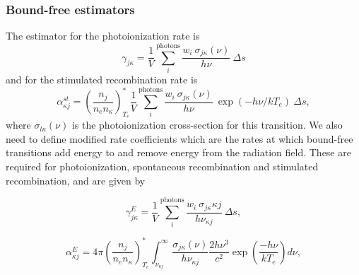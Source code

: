 \subsubsection{Bound-free estimators}
The estimator for the photoionization rate is 
\begin{equation}
\gamma_{j\kappa} = \frac{1}{V} \sum_i^{\mathrm{photons}} 
\frac{w_i~\sigma_{j\kappa}({\nu})}{h \nu}~\Delta s
\end{equation}
and for the stimulated recombination rate is
\begin{equation}
\alpha_{\kappa j}^{st} =\left( \frac{n_j}{n_e n_\kappa} \right)^*_{T_e}
\frac{1}{V} \sum_i^{\mathrm{photons}} 
\frac{w_i~\sigma_{j\kappa}({\nu})}{h \nu}
~\exp(-h\nu/kT_e)~\Delta s,
\end{equation}
where $\sigma_{l\kappa} (\nu)$ is the photoionization cross-section for this transition.
We also need to define modified rate coefficients which 
are the rates at which bound-free transitions add energy to and remove energy from 
the radiation field. These are required for photoionization, 
spontaneous recombination and stimulated recombination, and are given by

\begin{equation}
\gamma^E_{j\kappa} = \frac{1}{V} \sum_i^{\mathrm{photons}} 
\frac{w_i~\sigma_{j\kappa}{\kappa j}}{h \nu_{\kappa j}}~\Delta s, 
\end{equation}

\begin{equation}
\alpha^E_{\kappa j} = 4\pi \left( \frac{n_j}{n_e n_\kappa} \right)^*_{T_e}
 \int^\infty_{\nu_{\kappa j}} 
\frac{\sigma_{j \kappa}(\nu)}{h \nu_{\kappa j}} \frac{2 h \nu^3}{c^2} 
\exp \left( \frac{- h \nu}{k T_e} \right) d\nu,
\end{equation}

